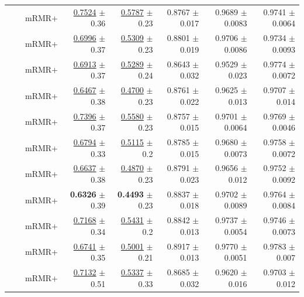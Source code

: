 \begin{longtable}{llp{}rrrrr}
 &  & mRMR+ & \underline{0.7524} {\scriptsize $\pm$ 0.36} & \underline{0.5787} {\scriptsize $\pm$ 0.23} & 0.8767 {\scriptsize $\pm$ 0.017} & 0.9689 {\scriptsize $\pm$ 0.0083} & 0.9741 {\scriptsize $\pm$ 0.0064} \\
 &  & mRMR+ & \underline{0.6996} {\scriptsize $\pm$ 0.37} & \underline{0.5309} {\scriptsize $\pm$ 0.23} & 0.8801 {\scriptsize $\pm$ 0.019} & 0.9706 {\scriptsize $\pm$ 0.0086} & 0.9734 {\scriptsize $\pm$ 0.0093} \\
 &  & mRMR+ & \underline{0.6913} {\scriptsize $\pm$ 0.37} & \underline{0.5289} {\scriptsize $\pm$ 0.24} & 0.8643 {\scriptsize $\pm$ 0.032} & 0.9529 {\scriptsize $\pm$ 0.023} & 0.9774 {\scriptsize $\pm$ 0.0072} \\
 &  & mRMR+ & \underline{0.6467} {\scriptsize $\pm$ 0.38} & \underline{0.4700} {\scriptsize $\pm$ 0.23} & 0.8761 {\scriptsize $\pm$ 0.022} & 0.9625 {\scriptsize $\pm$ 0.013} & 0.9707 {\scriptsize $\pm$ 0.014} \\
 &  & mRMR+ & \underline{0.7396} {\scriptsize $\pm$ 0.37} & \underline{0.5580} {\scriptsize $\pm$ 0.23} & 0.8757 {\scriptsize $\pm$ 0.015} & 0.9701 {\scriptsize $\pm$ 0.0064} & 0.9769 {\scriptsize $\pm$ 0.0046} \\
 &  & mRMR+ & \underline{0.6794} {\scriptsize $\pm$ 0.33} & \underline{0.5115} {\scriptsize $\pm$ 0.2} & 0.8785 {\scriptsize $\pm$ 0.015} & 0.9680 {\scriptsize $\pm$ 0.0073} & 0.9758 {\scriptsize $\pm$ 0.0072} \\
 &  & mRMR+ & \underline{0.6637} {\scriptsize $\pm$ 0.38} & \underline{0.4870} {\scriptsize $\pm$ 0.23} & 0.8791 {\scriptsize $\pm$ 0.023} & 0.9656 {\scriptsize $\pm$ 0.012} & 0.9752 {\scriptsize $\pm$ 0.0092} \\
 &  & mRMR+ & \textbf{0.6326} {\scriptsize $\pm$ 0.39} & \textbf{0.4493} {\scriptsize $\pm$ 0.23} & 0.8837 {\scriptsize $\pm$ 0.018} & 0.9702 {\scriptsize $\pm$ 0.0089} & 0.9764 {\scriptsize $\pm$ 0.0084} \\
 &  & mRMR+ & \underline{0.7168} {\scriptsize $\pm$ 0.34} & \underline{0.5431} {\scriptsize $\pm$ 0.2} & 0.8842 {\scriptsize $\pm$ 0.013} & 0.9737 {\scriptsize $\pm$ 0.0054} & 0.9746 {\scriptsize $\pm$ 0.0073} \\
 &  & mRMR+ & \underline{0.6741} {\scriptsize $\pm$ 0.35} & \underline{0.5001} {\scriptsize $\pm$ 0.21} & 0.8917 {\scriptsize $\pm$ 0.013} & 0.9770 {\scriptsize $\pm$ 0.0051} & 0.9783 {\scriptsize $\pm$ 0.007} \\
 &  & mRMR+ & \underline{0.7132} {\scriptsize $\pm$ 0.51} & \underline{0.5337} {\scriptsize $\pm$ 0.33} & 0.8685 {\scriptsize $\pm$ 0.032} & 0.9620 {\scriptsize $\pm$ 0.016} & 0.9703 {\scriptsize $\pm$ 0.012} \\

\end{longtable}
